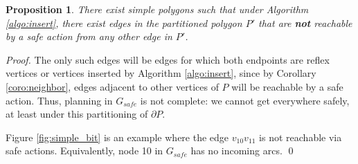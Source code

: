 \documentclass[sageh,times,Review]{sagej}
\newtheorem{proposition}{Proposition}
\begin{document}
\begin{proposition}
There exist simple polygons such that under Algorithm \ref{algo:insert}, there
exist edges in the partitioned polygon $P'$ that are \textbf{not} reachable by 
a safe action from any other edge in $P'$.
\end{proposition}

\begin{proof}
The only such edges will be
edges for which both endpoints are reflex vertices or vertices inserted by Algorithm
\ref{algo:insert}, since by Corollary \ref{coro:neighbor},
edges adjacent to other vertices of $P$ will be reachable by a safe
action. Thus, planning in $G_{safe}$ is not complete: we cannot
get everywhere safely, at least under this partitioning of $\partial P$.

Figure \ref{fig:simple_bit} is an example where the edge
$v_{10} v_{11}$ is not reachable via safe actions. Equivalently,
node 10 in $G_{safe}$ has no incoming arcs. \qed
\end{proof}
\end{document}
